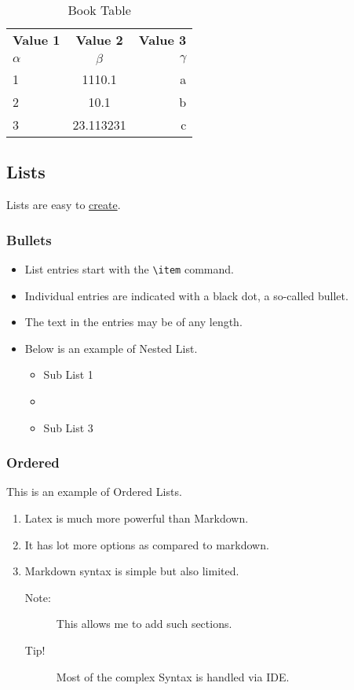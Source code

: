 \documentclass{report}[a4paper,12pt] %
\begin{document}
\begin{table}[h!]
  \centering
  \caption{Book Table}
  \label{tab:book}
  \begin{tabular}{@{}lcr@{}} %
    \toprule %
    \textbf{Value 1} & \textbf{Value 2} & \textbf{Value 3}\\
    $\alpha$ & $\beta$ & $\gamma$ \\
    \midrule %
    1 & 1110.1 & a\\
    2 & 10.1 & b\\
    3 & 23.113231 & c\\
    \bottomrule %
  \end{tabular}
\end{table}

\subsection{Lists}
Lists are easy to \href{https://www.overleaf.com/learn/latex/Lists}{create}.

\subsubsection{Bullets}
\begin{itemize}
  \label{lst:bullet}
  \item List entries start with the \verb|\item| command.
  \item Individual entries are indicated with a black dot, a so-called bullet.
  \item The text in the entries may be of any length.
  \item Below is an example of Nested List.
  \begin{itemize}
    \item Sub List 1
    \item \lipsum[1]
    \item Sub List 3
  \end{itemize}
\end{itemize}

\subsubsection{Ordered}
This is an example of Ordered Lists.

\begin{enumerate}[label=(\roman*)]
  \label{lst:order}
  \item Latex is much more powerful than Markdown.
  \item It has lot more options as compared to markdown.
  \item Markdown syntax is simple but also limited.
  \begin{description}
    \item[Note:] This allows me to add such sections.
    \item[Tip!] Most of the complex Syntax is handled via IDE.
  \end{description}
\end{enumerate}
\end{document}
